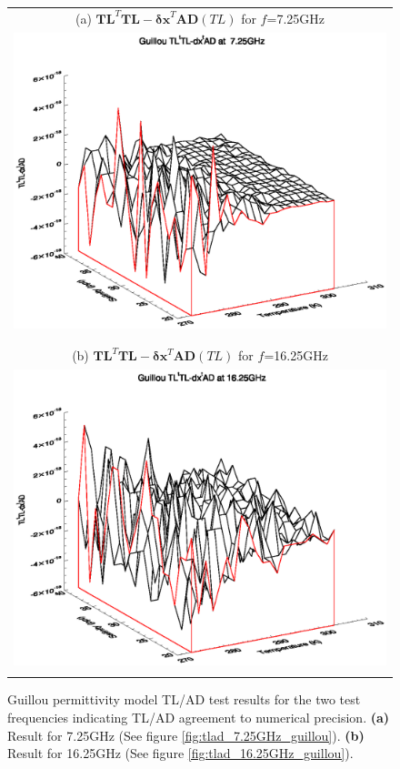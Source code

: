 \begin{figure}[htp]
  \centering
  \begin{tabular}{c}
    \textsf{(a) $\mathbf{TL}^{T}\mathbf{TL} - \mathbf{\delta x}^{T}\mathbf{AD}(TL)$ for $f$=7.25GHz}\\
    \includegraphics[bb=115 240 508 525,clip,scale=0.8]{graphics/Guillou/TLAD/TLtTL-dxtAD_7.25GHz.eps}\\\\\\
    \textsf{(b) $\mathbf{TL}^{T}\mathbf{TL} - \mathbf{\delta x}^{T}\mathbf{AD}(TL)$ for $f$=16.25GHz}\\
    \includegraphics[bb=115 240 508 525,clip,scale=0.8]{graphics/Guillou/TLAD/TLtTL-dxtAD_16.25GHz.eps}\\\\
  \end{tabular}
  \caption{Guillou permittivity model TL/AD test results for the two test frequencies indicating TL/AD agreement to numerical precision. \textbf{(a)} Result for 7.25GHz (See figure \ref{fig:tlad_7.25GHz_guillou}). \textbf{(b)} Result for 16.25GHz (See figure \ref{fig:tlad_16.25GHz_guillou}).}
  \label{fig:tlad_test_guillou}
\end{figure}



